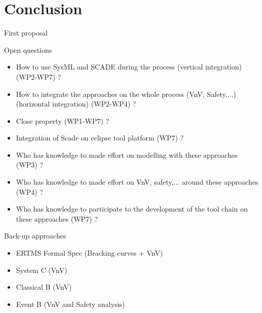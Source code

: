 
\section{Conclusion}


\begin{frame}{First proposal}


\begin{center}

 
\end{center}

\end{frame}


\begin{frame}{Open questions}


\begin{itemize}
\item 
How to use SysML and SCADE during the process (vertical integration) (WP2-WP7) ?
\item How to integrate the approaches on the whole process (VnV, Safety,...) (horizontal integration) (WP2-WP4) ?
\item
Close property (WP1-WP7) ?
\item
Integration of Scade on eclipse  tool platform (WP7) ?
\item
Who has knowledge to made effort on modelling with these approaches (WP3) ?
\item 
Who has knowledge to made effort on VnV, safety,... around these approaches (WP4) ?
\item
Who has knowledge to participate to the development of the tool chain on these approaches (WP7) ?
\end{itemize}

\end{frame}


\begin{frame}{Back-up approaches}

\begin{itemize}
\item ERTMS Formal Spec (Bracking curves + VnV)
\item System C (VnV)
\item Classical B (VnV)
\item Event B (VnV and Safety analysis)
\end{itemize}

\end{frame}

